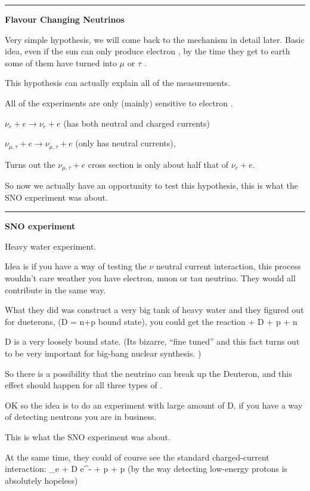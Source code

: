 {\noindent\rule{\textwidth}{1pt}

\textbf{Flavour Changing Neutrinos}

Very simple hypothesis, we will come back to the mechanism in detail later. 
Basic idea, even if the sun can only produce electron \nus, by the time they get to earth some of them have turned into $\mu$ or $\tau$ \nus. 


This hypothesis can actually explain all of the measurements.  

All of the experiments are only (mainly) sensitive to electron \nus.

\bc
$\nu_e + e \rightarrow \nu_e + e$  (has both neutral and charged currents) 
\ec

\bc
$\nu_{\mu,\tau} + e \rightarrow \nu_{\mu,\tau} + e$  (only has neutral currents), 
\ec

Turns out the $\nu_{\mu,\tau} + e$ cross section is only about half that of $\nu_e + e$.

So now we actually have an opportunity to test this hypothesis, this is what the SNO experiment was about.

\noindent\rule{\textwidth}{1pt}

\clearpage

\textbf{SNO experiment}

Heavy water experiment.

Idea is if you have a way of testing the $\nu$ neutral current interaction, this process wouldn't care weather you have electron, muon or tau neutrino. 
They would all contribute in the same way. 

What they did was construct a very big tank of heavy water and they figured out for dueterons, (D  = n+p bound state), you could get the reaction
\be
\nu + D \rightarrow \nu + p + n
\ee

D is a very loosely bound state. (Its bizarre, ``fine tuned'' and this fact turns out to be very important for big-bang nuclear synthesis. )

So there is a possibility that the neutrino can break up the Deuteron, and this effect should happen for all three types of \nus.

OK so the idea is to do an experiment with large amount of D, if you have a way of detecting neutrons you are in business.

This is what the SNO experiment was about. 

At the same time, they could of course see the standard charged-current interaction:
\be
\nu_e + D \rightarrow e^- + p + p
\ee
(by the way detecting low-energy protons is absolutely hopeless)


}

